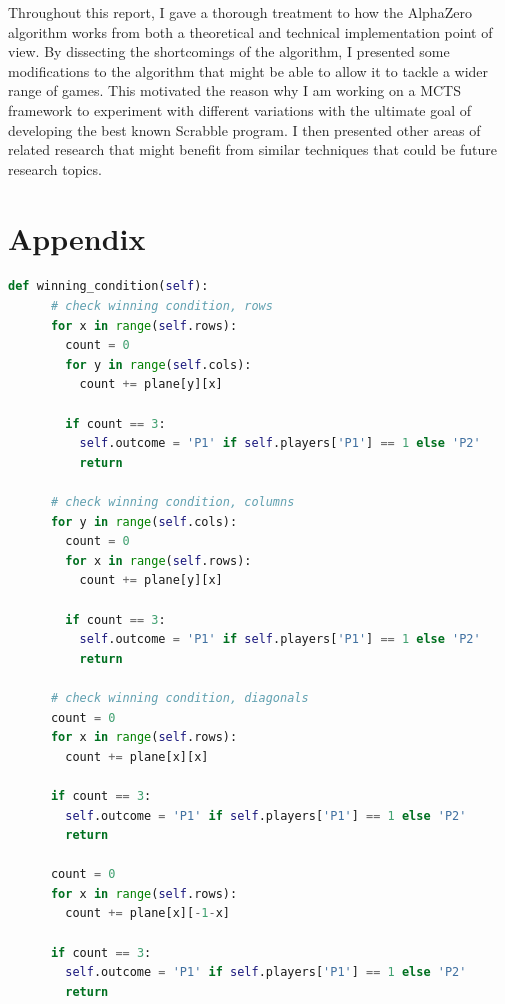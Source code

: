 \documentclass{article}
\begin{document}
  Throughout this report, I gave a thorough treatment to how the AlphaZero algorithm works from both a theoretical and technical implementation point of view. By dissecting the shortcomings of the algorithm, I presented some modifications to the algorithm that might be able to allow it to tackle a wider range of games. This motivated the reason why I am working on a MCTS framework to experiment with different variations with the ultimate goal of developing the best known Scrabble program. I then presented other areas of related research that might benefit from similar techniques that could be future research topics.

  \clearpage

  
  

  \clearpage

  \appendix

  \section*{Appendix}

  \lstset{basicstyle=\tiny}
  \begin{lstlisting}[language=Python]
    def winning_condition(self):
      # check winning condition, rows
      for x in range(self.rows):
        count = 0
        for y in range(self.cols):
          count += plane[y][x]

        if count == 3:
          self.outcome = 'P1' if self.players['P1'] == 1 else 'P2'
          return

      # check winning condition, columns
      for y in range(self.cols):
        count = 0
        for x in range(self.rows):
          count += plane[y][x]

        if count == 3:
          self.outcome = 'P1' if self.players['P1'] == 1 else 'P2'
          return

      # check winning condition, diagonals
      count = 0
      for x in range(self.rows):
        count += plane[x][x]

      if count == 3:
        self.outcome = 'P1' if self.players['P1'] == 1 else 'P2'
        return

      count = 0
      for x in range(self.rows):
        count += plane[x][-1-x]

      if count == 3:
        self.outcome = 'P1' if self.players['P1'] == 1 else 'P2'
        return

    \end{lstlisting}
\end{document}
